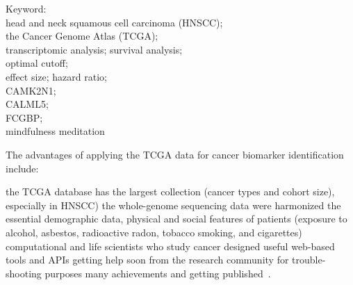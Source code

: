 \documentclass[
paper=landscape,
paper=160mm:90mm, %
fontsize=11pt, %
pagesize, %
parskip=half-, %
]{scrartcl} %
\theoremstyle{mythmstyle} %
\begin{document}
\clearpage


Keyword:\\
head and neck squamous cell carcinoma (HNSCC);\\
the Cancer Genome Atlas (TCGA); \\
transcriptomic analysis; survival analysis; \\
optimal cutoff; \\
effect size; hazard ratio;\\
\acrfull{CAMK2N1}; \\
\acrfull{CALML5}; \\
\acrfull{FCGBP}; \\
mindfulness meditation



\clearpage

The advantages of applying the TCGA data for cancer biomarker identification include:
\begin{outline}
\1  the TCGA database has the largest collection (cancer types and cohort size), especially in HNSCC)
\2 the whole-genome sequencing data were harmonized
\2 the essential demographic data, physical and social features of patients (exposure to alcohol, asbestos, radioactive radon, tobacco smoking, and cigarettes)
\2 computational and life scientists who study cancer designed useful web-based tools and APIs
\1 getting help soon from the research community for trouble-shooting purposes
\1 many achievements and getting published~\cite{Tomczak2015}.
\end{outline}

\clearpage
\end{document}
